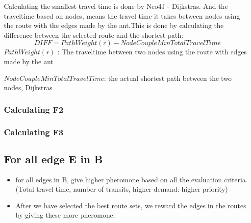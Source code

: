 Calculating the smallest travel time is done by Neo4J - Dijkstras. 
And the traveltime based on nodes, means the travel time it takes between nodes using the route with the edges made by the ant.This is done by calculating the difference between the selected route and the shortest path:
$$ DIFF = PathWeight(r) - NodeCoupleMinTotalTravelTime$$
$ PathWeight(r)$ : The traveltime between two nodes using the route with edges made by the ant
\par 
$ NodeCoupleMinTotalTravelTime$: the actual shortest path between the two nodes, Dijkstras




\subsubsection{Calculating F2}
\subsubsection{Calculating F3}

\subsection{For all edge E in B}
\begin{itemize}
\item for all edges in B, give higher pheromone based on all the evaluation criteria. (Total travel time, number of transits, higher demand: higher priority)
\item After we have selected the best route sets, we reward the edges in the routes by giving these more pheromone.
\end{itemize}


